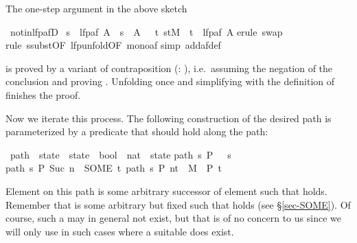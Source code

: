 \begin{isabellebody}
\begin{isamarkuptext}
The one-step argument in the above sketch%
\end{isamarkuptext}%
\ not{\isacharunderscore}in{\isacharunderscore}lfp{\isacharunderscore}afD{\isacharcolon}\isanewline
\ {\isachardoublequote}s\ {\isasymnotin}\ lfp{\isacharparenleft}af\ A{\isacharparenright}\ {\isasymLongrightarrow}\ s\ {\isasymnotin}\ A\ {\isasymand}\ {\isacharparenleft}{\isasymexists}\ t{\isachardot}\ {\isacharparenleft}s{\isacharcomma}t{\isacharparenright}{\isasymin}M\ {\isasymand}\ t\ {\isasymnotin}\ lfp{\isacharparenleft}af\ A{\isacharparenright}{\isacharparenright}{\isachardoublequote}\isanewline
{}erule\ swap{\isacharparenright}\isanewline
{}rule\ ssubst{\isacharbrackleft}OF\ lfp{\isacharunderscore}unfold{\isacharbrackleft}OF\ mono{\isacharunderscore}af{\isacharbrackright}{\isacharbrackright}{\isacharparenright}\isanewline
{}simp\ add{\isacharcolon}af{\isacharunderscore}def{\isacharparenright}\isanewline
{}%
\begin{isamarkuptext}%
\noindent
is proved by a variant of contraposition (:
), i.e.\ assuming the negation of the conclusion
and proving . Unfolding  once and
simplifying with the definition of  finishes the proof.

Now we iterate this process. The following construction of the desired
path is parameterized by a predicate  that should hold along the path:%
\end{isamarkuptext}%
\ path\ {\isacharcolon}{\isacharcolon}\ {\isachardoublequote}state\ {\isasymRightarrow}\ {\isacharparenleft}state\ {\isasymRightarrow}\ bool{\isacharparenright}\ {\isasymRightarrow}\ {\isacharparenleft}nat\ {\isasymRightarrow}\ state{\isacharparenright}{\isachardoublequote}\isanewline
{}\isanewline
{\isachardoublequote}path\ s\ P\ \ {\isacharequal}\ s{\isachardoublequote}\isanewline
{\isachardoublequote}path\ s\ P\ {\isacharparenleft}Suc\ n{\isacharparenright}\ {\isacharequal}\ {\isacharparenleft}SOME\ t{\isachardot}\ {\isacharparenleft}path\ s\ P\ n{\isacharcomma}t{\isacharparenright}\ {\isasymin}\ M\ {\isasymand}\ P\ t{\isacharparenright}{\isachardoublequote}%
\begin{isamarkuptext}%
\noindent
Element  on this path is some arbitrary successor
 of element  such that  holds.  Remember that 
is some arbitrary but fixed  such that  holds (see \S\ref{sec-SOME}). Of
course, such a  may in general not exist, but that is of no
concern to us since we will only use  in such cases where a
suitable  does exist.


\end{isamarkuptext}
\end{isabellebody}
